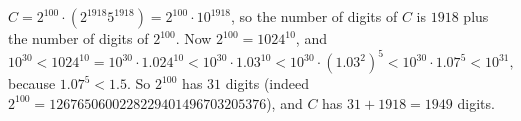 $C=2^{100}\cdot\left(2^{1918}5^{1918}\right)=2^{100}\cdot10^{1918}$, so the number of digits of $C$ is $1918$ plus the number of digits of $2^{100}$. Now $2^{100}=1024^{10}$, and
\[
10^{30}<1024^{10}=10^{30}\cdot1.024^{10}<10^{30}\cdot1.03^{10}<10^{30}\cdot\left(1.03^{2}\right)^{5}<10^{30}\cdot1.07^5<10^{31},
\]
because $1.07^5<1.5$. So $2^{100}$ has $31$ digits (indeed $2^{100}=1267650600228229401496703205376$), and $C$ has $31+1918=\boxed{1949}$ digits.
